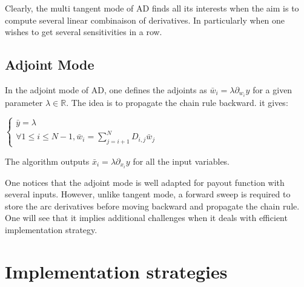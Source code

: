 \documentclass {article}
\begin{document}
				Clearly, the multi tangent mode of AD finds all its interests when the aim is to compute several linear combinaison of derivatives.
				In particularly when one wishes to get several sensitivities in a row.
				
		\subsection{Adjoint Mode}
			
			In the adjoint mode of AD, one defines the adjoints as $\bar w_{i} = \lambda \partial_{w_{i}}y$ for a given parameter $\lambda \in \mathbb{R}$. 
			The idea is to propagate the chain rule backward. it gives:
			
			\begin{center}
				$\begin{cases} \bar y = \lambda \\ \forall 1 \leq i \leq N-1, \bar w_{i} = \displaystyle{\sum_{j=i+1}^{N} D_{i,j} \bar w_{j}} \end{cases}$ 
			\end{center}
			
			The algorithm outputs $\bar x_{i} = \lambda \partial_{x_{i}} y$ for all the input variables.
			
			
			One notices that the adjoint mode is well adapted for payout function with several inputs. However, unlike tangent mode, a forward sweep is required to store the arc derivatives before moving backward and propagate the chain rule.
			One will see that it implies additional challenges when it deals with efficient implementation strategy.
				
	\section{Implementation strategies}
	
\end{document}
